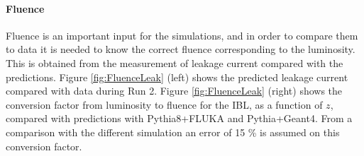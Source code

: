 \paragraph*{Fluence}
Fluence is an important input for the simulations, and in order to compare them to data it is needed to know the correct fluence corresponding to the luminosity. This is obtained from the measurement of leakage current compared with the predictions. Figure \ref{fig:FluenceLeak} (left) shows the predicted leakage current compared with data during Run 2. Figure \ref{fig:FluenceLeak} (right) shows the conversion factor from luminosity to fluence for the IBL, as a function of $z$, compared with predictions with Pythia8+FLUKA \cite{Sjostrand:2014zea,Ferrari:898301} and Pythia+Geant4. From a comparison with the different simulation an error of 15 \% is assumed on this conversion factor.


